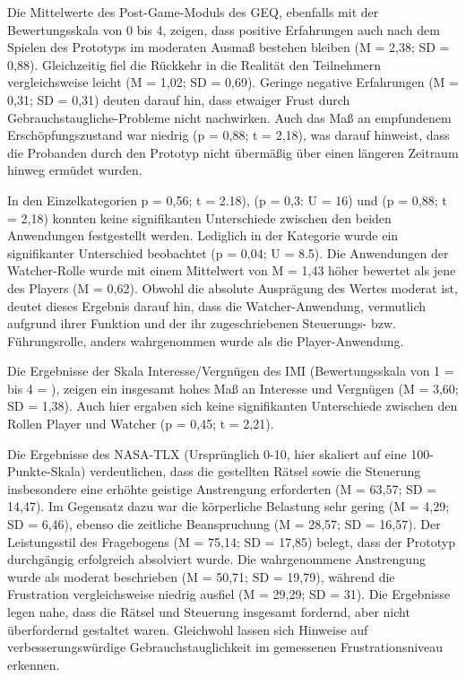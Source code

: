 Die Mittelwerte des Post-Game-Moduls des \ac{GEQ}, ebenfalls mit der Bewertungsskala von 0 bis 4, zeigen, dass positive Erfahrungen auch nach dem Spielen des Prototyps im moderaten Ausmaß bestehen bleiben (M = 2,38; SD = 0,88). Gleichzeitig fiel die Rückkehr in die Realität den Teilnehmern vergleichsweise leicht (M = 1,02; SD = 0,69). Geringe negative Erfahrungen (M = 0,31; SD = 0,31) deuten darauf hin, dass etwaiger Frust durch Gebrauchstaugliche-Probleme nicht nachwirken. Auch das Maß an empfundenem Erschöpfungszustand war niedrig (p = 0,88; t = 2,18), was darauf hinweist, dass die Probanden durch den Prototyp nicht übermäßig über einen längeren Zeitraum hinweg ermüdet wurden.

In den Einzelkategorien  p = 0,56; t = 2.18),  (p = 0,3: U = 16) und  (p = 0,88; t = 2,18) konnten keine signifikanten Unterschiede zwischen den beiden Anwendungen festgestellt werden. Lediglich in der Kategorie  wurde ein signifikanter Unterschied beobachtet (p = 0,04; U = 8.5). Die Anwendungen der Watcher-Rolle wurde mit einem Mittelwert von M = 1,43 höher bewertet als jene des Players (M = 0,62). Obwohl die absolute Ausprägung des Wertes moderat ist, deutet dieses Ergebnis darauf hin, dass die Watcher-Anwendung, vermutlich aufgrund ihrer Funktion und der ihr zugeschriebenen Steuerungs- bzw. Führungsrolle, anders wahrgenommen wurde als die Player-Anwendung.

Die Ergebnisse der Skala Interesse/Vergnügen des \ac{IMI} (Bewertungsskala von 1 =  bis 4 = ), zeigen ein insgesamt hohes Maß an Interesse und Vergnügen (M = 3,60; SD = 1,38). Auch hier ergaben sich keine signifikanten Unterschiede zwischen den Rollen Player und Watcher (p = 0,45; t = 2,21). 

Die Ergebnisse des \ac{NASA-TLX} (Ursprünglich 0-10, hier skaliert auf eine 100-Punkte-Skala) verdeutlichen, dass die gestellten Rätsel sowie die Steuerung insbesondere eine erhöhte geistige Anstrengung erforderten (M = 63,57; SD = 14,47). Im Gegensatz dazu war die körperliche Belastung sehr gering  (M = 4,29; SD = 6,46), ebenso die zeitliche Beanspruchung (M = 28,57; SD = 16,57). Der Leistungsstil des Fragebogens (M = 75,14; SD = 17,85) belegt, dass der Prototyp durchgängig erfolgreich absolviert wurde. Die wahrgenommene Anstrengung wurde als moderat beschrieben (M = 50,71; SD = 19,79),  während die Frustration vergleichsweise niedrig ausfiel  (M = 29,29; SD = 31). Die Ergebnisse legen nahe, dass die Rätsel und Steuerung insgesamt fordernd, aber nicht überfordernd gestaltet waren. Gleichwohl lassen sich Hinweise auf verbesserungswürdige Gebrauchstauglichkeit im gemessenen Frustrationsniveau erkennen.

